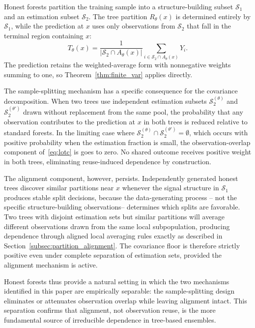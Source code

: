 \documentclass[11pt]{article}
\theoremstyle{plain}
\theoremstyle{definition}
\theoremstyle{remark}
\begin{document}
Honest forests \citep{athey2019, wager2018} partition the training sample into a structure-building subset $\mathcal S_1$ and an estimation subset $\mathcal S_2$. The tree partition $R_\theta(x)$ is determined entirely by $\mathcal S_1$, while the prediction at $x$ uses only observations from $\mathcal S_2$ that fall in the terminal region containing $x$:
\[
T_\theta(x) = \frac{1}{|\mathcal S_2 \cap A_\theta(x)|} \sum_{i \in \mathcal S_2 \cap A_\theta(x)} Y_i.
\]
The prediction retains the weighted-average form with nonnegative weights summing to one, so Theorem~\ref{thm:finite_var} applies directly.

The sample-splitting mechanism has a specific consequence for the covariance decomposition. When two trees use independent estimation subsets $\mathcal S_2^{(\theta)}$ and $\mathcal S_2^{(\theta')}$ drawn without replacement from the same pool, the probability that any observation contributes to the prediction at $x$ in both trees is reduced relative to standard forests. In the limiting case where $\mathcal S_2^{(\theta)} \cap \mathcal S_2^{(\theta')} = \emptyset$, which occurs with positive probability when the estimation fraction is small, the observation-overlap component of~\eqref{eq:lotc} is goes to zero. No shared outcome receives positive weight in both trees, eliminating reuse-induced dependence by construction.

The alignment component, however, persists. Independently generated honest trees discover similar partitions near $x$ whenever the signal structure in $\mathcal S_1$ produces stable split decisions, because the data-generating process -- not the specific structure-building observations-- determines which splits are favorable. Two trees with disjoint estimation sets but similar partitions will average different observations drawn from the same local subpopulation, producing dependence through aligned local averaging rules exactly as described in Section~\ref{subsec:partition_alignment}. The covariance floor is therefore strictly positive even under complete separation of estimation sets, provided the alignment mechanism is active.

Honest forests thus provide a natural setting in which the two mechanisms identified in this paper are empirically separable: the sample-splitting design eliminates or attenuates observation overlap while leaving alignment intact. This separation confirms that alignment, not observation reuse, is the more fundamental source of irreducible dependence in tree-based ensembles.
\end{document}
